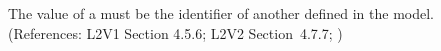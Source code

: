 The   value of a \Compartment must be the identifier of
another \Compartment defined in the model.  (References: L2V1 Section
4.5.6; L2V2 Section~4.7.7; )
